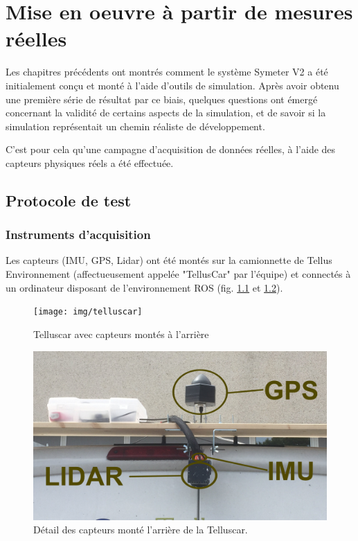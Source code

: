 \documentclass[12pt,a4paper]{report}
\begin{document}
		
	
\chapter{Mise en oeuvre à partir de mesures réelles}
\label{chap-mesuresreelles}

Les chapitres précédents ont montrés comment le système Symeter V2 a été initialement conçu et monté à l'aide d'outils de simulation. Après avoir obtenu une première série de résultat par ce biais, quelques questions ont émergé concernant la validité de certains aspects de la simulation, et de savoir si la simulation représentait un chemin réaliste de développement.

\para C'est pour cela qu'une campagne d'acquisition de données réelles, à l'aide des capteurs physiques réels a été effectuée.

	\section{Protocole de test}
	\subsection{Instruments d'acquisition}
	Les capteurs (IMU, GPS, Lidar) ont été montés sur la camionnette de Tellus Environnement (affectueusement appelée "TellusCar" par l'équipe) et connectés à un ordinateur disposant de l'environnement ROS (fig. \ref{fig:telluscar} et \ref{fig:telluscardetail}).
	
	\begin{figure}[h!]
		\centering
		\texttt{[image: img/telluscar]}
		\caption[telluscar]{Telluscar avec capteurs montés à l'arrière}
		\label{fig:telluscar}
	\end{figure}

	\begin{figure}[h!]
		\centering
		\includegraphics[width=0.7\linewidth]{img/telluscardetail}
		\caption[telluscardetail]{Détail des capteurs monté l'arrière de la Telluscar.}
		\label{fig:telluscardetail}
	\end{figure}
\end{document}
